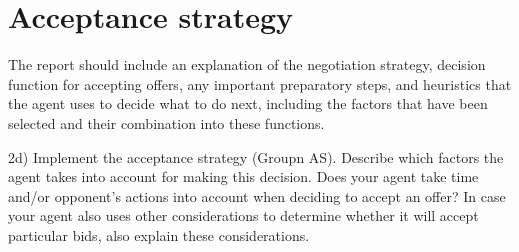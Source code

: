 \section{Acceptance strategy}

The report should include an explanation of the negotiation strategy, decision function for accepting offers, any important preparatory steps, and heuristics that the agent uses to decide what to do next, including the factors that have been selected and their combination into these functions.

2d) Implement the acceptance strategy (Groupn AS). Describe which factors the agent takes into
account for making this decision. Does your agent take time and/or opponent’s actions into
account when deciding to accept an offer? In case your agent also uses other considerations to
determine whether it will accept particular bids, also explain these considerations.